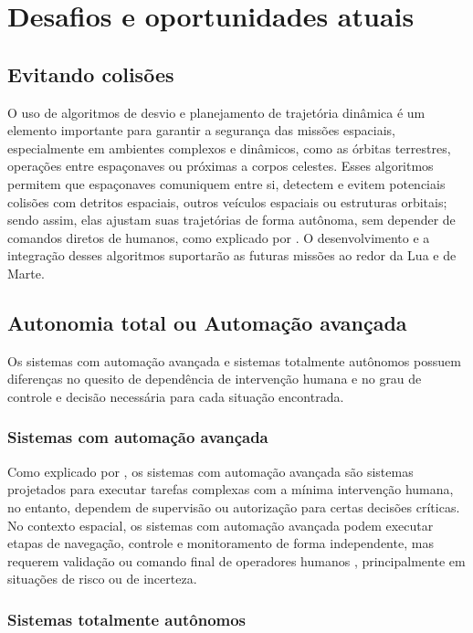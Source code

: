 \section{Desafios e oportunidades atuais}

\subsection{Evitando colisões}

O uso de algoritmos de desvio e planejamento de trajetória dinâmica é um elemento importante para garantir a segurança das missões espaciais, especialmente em ambientes complexos e dinâmicos, como as órbitas terrestres, operações entre espaçonaves ou próximas a corpos celestes.
Esses algoritmos permitem que espaçonaves comuniquem entre si, detectem e evitem potenciais colisões com detritos espaciais, outros veículos espaciais ou estruturas orbitais; sendo assim, elas ajustam suas trajetórias de forma autônoma, sem depender de comandos diretos de humanos, como explicado por \cite{newman2024}.
O desenvolvimento e a integração desses algoritmos suportarão as futuras missões ao redor da Lua e de Marte.

\subsection{Autonomia total ou Automação avançada}

Os sistemas com automação avançada e sistemas totalmente autônomos possuem diferenças no quesito de dependência de intervenção humana e no grau de controle e decisão necessária para cada situação encontrada.

\subsubsection{Sistemas com automação avançada}

Como explicado por \cite{ibmAutomation}, os sistemas com automação avançada são sistemas projetados para executar tarefas complexas com a mínima intervenção humana, no entanto, dependem de supervisão ou autorização para certas decisões críticas.
No contexto espacial, os sistemas com automação avançada podem executar etapas de navegação, controle e monitoramento de forma independente, mas requerem validação ou comando final de operadores humanos \cite{nasaNAC2018}, principalmente em situações de risco ou de incerteza.

\subsubsection{Sistemas totalmente autônomos}

